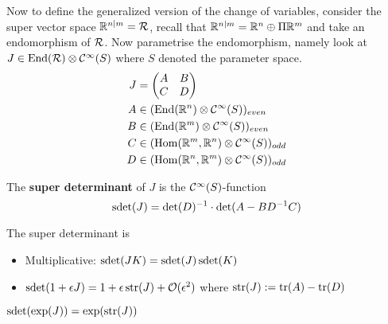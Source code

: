 \begin{rem}
  Now to define the generalized version of the change of variables, consider the super vector space $\mathbb{R}^{n|m} = \mathcal{R}$, recall that $\mathbb{R}^{n|m} = \mathbb{R}^n \oplus \Pi \mathbb{R}^m$ and take an endomorphism of $\mathcal{R}$. Now parametrise the endomorphism, namely look at $J \in \operatorname{End}(\mathcal{R}) \otimes \mathcal{C}^{\infty}(S)$ where $S$ denoted the parameter space.
  \begingroup
    \allowdisplaybreaks
    \begin{align}
    J &=
    \begin{pmatrix}
      A & B \\
      C & D
    \end{pmatrix} \\
    A &\in (\operatorname{End}(\mathbb{R}^n) \otimes \mathcal{C}^{\infty}(S))_{even} \\
    B &\in (\operatorname{End}(\mathbb{R}^m) \otimes \mathcal{C}^{\infty}(S))_{even} \\
    C &\in (\operatorname{Hom}(\mathbb{R}^m, \mathbb{R}^n) \otimes \mathcal{C}^{\infty}(S))_{odd} \\
    D &\in (\operatorname{Hom}(\mathbb{R}^n, \mathbb{R}^m) \otimes \mathcal{C}^{\infty}(S))_{odd}
    \end{align}
  \endgroup

  \begin{definition}
    The \textbf{super determinant} of $J$ is the $\mathcal{C}^{\infty}(S)$-function
    $$ \operatorname{sdet}(J) = \det(D)^{-1} \cdot \det(A-BD^{-1} C) $$
  \end{definition}

  \begin{lem}
    The super determinant is
    \begin{itemize}
      \item Multiplicative: $\operatorname{sdet}(JK) = \operatorname{sdet}(J) \operatorname{sdet}(K)$
      \item $\sdet(1 + \epsilon J) = 1 + \epsilon \str(J)+ \OO(\epsilon^2)$ where $\operatorname{str}(J) := \operatorname{tr}(A) - \operatorname{tr}(D)$
    \end{itemize}
  \end{lem}

  \begin{corollary}
    $\operatorname{sdet}(\exp(J)) = \exp(\operatorname{str}(J))$
  \end{corollary}


\end{rem}
